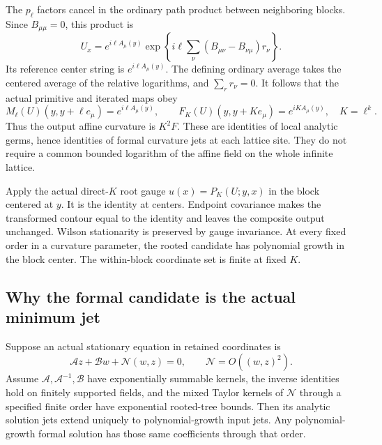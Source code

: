 The \(p_\ell\) factors cancel in the ordinary path product
between neighboring blocks. Since \(B_{\mu\mu}=0\), this
product is
\[
 U_x=e^{i\ell A_\mu(y)}
       \exp\!\left\{i\ell\sum_\nu
                 (B_{\mu\nu}-B_{\nu\mu})r_\nu\right\}.
\]
Its reference center string is \(e^{i\ell A_\mu(y)}\).
The defining ordinary average takes the centered average
of the relative logarithms, and \(\sum_r r_\nu=0\).
It follows that the actual primitive and iterated maps obey
\begin{equation}
 M_\ell(U)(y,y+\ell e_\mu)=e^{i\ell A_\mu(y)},\qquad
 F_K(U)(y,y+Ke_\mu)=e^{iK A_\mu(y)},\quad K=\ell^k.
 \label{cdmom-average}
\end{equation}
Thus the output affine curvature is \(K^2F\).
These are identities of local analytic germs, hence
identities of formal curvature jets at each lattice site.
They do not require a common bounded logarithm of the
affine field on the whole infinite lattice.

Apply the actual direct-\(K\) root gauge
\(u(x)=P_K(U;y,x)\) in the block centered at \(y\).
It is the identity at centers. Endpoint covariance makes
the transformed contour equal to the identity and leaves
the composite output unchanged. Wilson stationarity
is preserved by gauge invariance. At every fixed order
in a curvature parameter, the rooted candidate has
polynomial growth in the block center. The within-block
coordinate set is finite at fixed \(K\).

\subsection{Why the formal candidate is the actual minimum jet}
\label{cdmom-jet-section}

\begin{lemma}
\label{cdmom-polynomial-lemma}
Suppose an actual stationary equation in retained coordinates is
\[
 \mathcal A z+\mathcal B w+\mathcal N(w,z)=0,\qquad
                     \mathcal N=O((w,z)^2).
\]
Assume \(\mathcal A,\mathcal A^{-1},\mathcal B\) have
exponentially summable kernels, the inverse identities
hold on finitely supported fields, and the mixed Taylor
kernels of \(\mathcal N\) through a specified finite
order have exponential rooted-tree bounds. Then its
analytic solution jets extend uniquely to polynomial-growth
input jets. Any polynomial-growth formal solution has
those same coefficients through that order.
\end{lemma}

